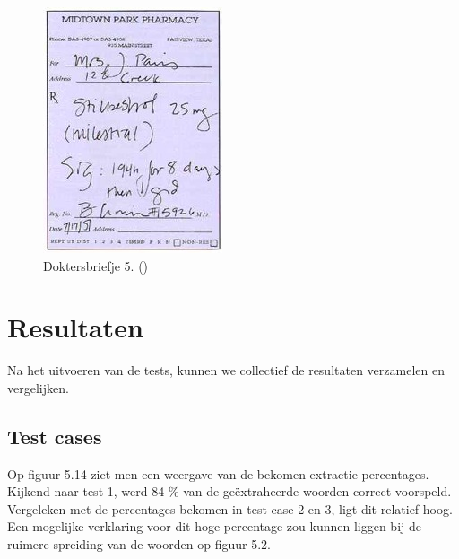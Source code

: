 \begin{figure}
	
	\includegraphics[width=\textwidth,height=\textheight,keepaspectratio]{../doktersbriefjes/dokterbriefje_5.jpg}
		\captionsetup{justification=centering,margin=2cm}
	\caption{Doktersbriefje 5. (\cite{Abrahams2008})}
	\centering
\end{figure}
\clearpage
\section{Resultaten}
Na het uitvoeren van de tests, kunnen we collectief de resultaten verzamelen en vergelijken.  
\subsection{Test cases}
Op figuur 5.14 ziet men een weergave van de bekomen extractie percentages.  Kijkend naar test 1, werd 84 \% van de geëxtraheerde woorden correct voorspeld. Vergeleken met de percentages bekomen in test case 2 en 3, ligt dit relatief hoog. Een mogelijke verklaring voor dit hoge percentage zou kunnen liggen bij de ruimere spreiding van de woorden op figuur 5.2.  



